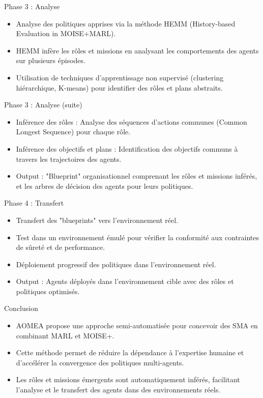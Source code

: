 \documentclass{beamer}
\begin{document}
\begin{frame}{Phase 3 : Analyse}
    \begin{itemize}
        \item Analyse des politiques apprises via la méthode HEMM (History-based Evaluation in MOISE+MARL).
        \item HEMM infère les rôles et missions en analysant les comportements des agents sur plusieurs épisodes.
        \item Utilisation de techniques d'apprentissage non supervisé (clustering hiérarchique, K-means) pour identifier des rôles et plans abstraits.
    \end{itemize}
\end{frame}

\begin{frame}{Phase 3 : Analyse (suite)}
    \begin{itemize}
        \item Inférence des rôles : Analyse des séquences d'actions communes (Common Longest Sequence) pour chaque rôle.
        \item Inférence des objectifs et plans : Identification des objectifs communs à travers les trajectoires des agents.
        \item Output : "Blueprint" organisationnel comprenant les rôles et missions inférés, et les arbres de décision des agents pour leurs politiques.
    \end{itemize}
\end{frame}

\begin{frame}{Phase 4 : Transfert}
    \begin{itemize}
        \item Transfert des "blueprints" vers l'environnement réel.
        \item Test dans un environnement émulé pour vérifier la conformité aux contraintes de sûreté et de performance.
        \item Déploiement progressif des politiques dans l'environnement réel.
        \item Output : Agents déployés dans l'environnement cible avec des rôles et politiques optimisés.
    \end{itemize}
\end{frame}

\begin{frame}{Conclusion}
    \begin{itemize}
        \item AOMEA propose une approche semi-automatisée pour concevoir des SMA en combinant MARL et MOISE+.
        \item Cette méthode permet de réduire la dépendance à l'expertise humaine et d'accélérer la convergence des politiques multi-agents.
        \item Les rôles et missions émergents sont automatiquement inférés, facilitant l'analyse et le transfert des agents dans des environnements réels.
    \end{itemize}
\end{frame}
\end{document}

